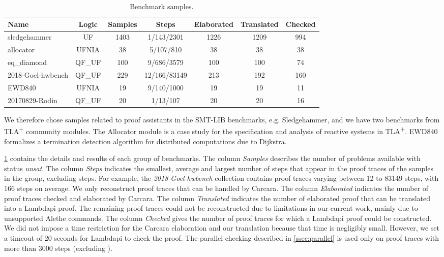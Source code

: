 \begin{table}%
    \begin{tabular}{|l c c c c c c|}
    \hline
    Name & Logic & Samples & Steps & Elaborated & Translated & Checked \\
    \hline
    sledgehammer & UF & 1403 & 1/143/2301 & 1226 & 1209 & 994 \\
    allocator & UFNIA & 38 & 5/107/810 & 38 & 38 & 38 \\
    eq\_diamond & QF{\_}UF & 100 & 9/686/3579 & 100  & 100 & 74 \\
    2018-Goel-hwbench & QF{\_}UF & 229 & 12/166/83149 & 213 & 192 & 160\\
    EWD840 & UFNIA & 19 & 9/140/1000 & 19 & 19 & 11 \\
    20170829-Rodin & QF{\_}UF & 20 & 1/13/107 &  20 & 20 & 16\\
    \hline
    \end{tabular}
    \caption{Benchmark samples.}
    \label{tab:benchmarks-description}
\end{table}

We therefore chose samples related to proof assistants in the SMT-LIB benchmarks, e.g. Sledgehammer, and we have two benchmarks from TLA\textsuperscript{+} community modules.
The Allocator module \cite{allocator} is a case study for the specification and analysis of reactive systems in TLA\textsuperscript{+}. EWD840 \cite{ewd840} formalizes a termination detection algorithm for distributed computations due to Dijkstra.

\cref{tab:benchmarks-description} contains the details and results of each group of benchmarks.
The column \emph{Samples} describes the number of problems available with status \emph{unsat}. 
The column \emph{Steps} indicates the smallest, average and largest number of steps that appear in the proof traces of the samples in the group, excluding  steps.
For example, the \emph{2018-Goel-hwbench} collection contains proof traces varying between 12 to 83149 steps, with 166 steps on average.
We only reconstruct proof traces that can be handled by Carcara.
The column \emph{Elaborated} indicates the number of proof traces checked and elaborated by Carcara.
The column \emph{Translated} indicates the number of elaborated proof that can be translated into a Lambdapi proof.
The remaining proof traces could not be reconstructed due to limitations in our current work, mainly due to unsupported Alethe commands.
The column \emph{Checked} gives the number of proof traces for which a Lambdapi proof could be constructed.
We did not impose a time restriction for the Carcara elaboration and our translation because that time is negligibly small.
However, we set a timeout of 20 seconds for Lambdapi to check the proof.
The parallel checking described in \cref{ssec:parallel} is used only on proof traces with more than 3000 steps (excluding ). 

